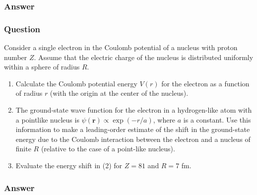 \subsubsection{Answer}



\subsubsection{Question}

Consider a single electron in the Coulomb potential of a nucleus with proton number $Z$. Assume that the electric charge of the nucleus is distributed uniformly within a sphere of radius $R$.
\begin{enumerate}
	\item Calculate the Coulomb potential energy $V (r)$ for the electron as a function of radius $r$ (with the origin at the center of the nucleus).
	\item The ground-state wave function for the electron in a hydrogen-like atom with a pointlike nucleus is $\psi(\mathbf{r})\propto\exp(-r/a)$, where $a$ is a constant. Use this information to make a leading-order estimate of the shift in the ground-state energy due to the Coulomb interaction between the electron and a nucleus of finite $R$ (relative to the case of a point-like nucleus).
	\item Evaluate the energy shift in (2) for $Z = 81$ and $R = 7$ fm.
\end{enumerate}

\subsubsection{Answer}


